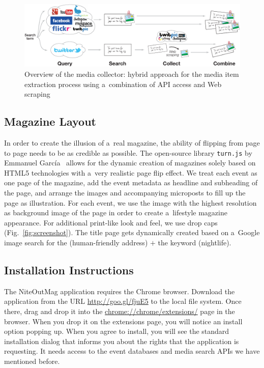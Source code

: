 \documentclass[runningheads,a4paper]{llncs}
\begin{document}
{\begin{figure}[htb!]
\centering
\includegraphics[width=0.8\linewidth]{./architecture.pdf}
\caption{Overview of the media collector: hybrid approach for the media item extraction process using a~combination of API access and Web scraping}
\label{fig:architecture}
\end{figure}

\subsection{Magazine Layout}
In order to create the illusion of a~real magazine, the ability of flipping from page to page needs to be as credible as possible. The open-source library \texttt{turn.js} by Emmanuel García~\cite{TurnJs2012} allows for the dynamic creation of magazines solely based on HTML5 technologies with a~very realistic page flip effect. We treat each event as one page of the magazine, add the event metadata as headline and subheading of the page, and arrange the images and accompanying microposts to fill up the page as illustration. For each event, we use the image with the highest resolution as background image of the page in order to create a~lifestyle magazine appearance. For additional print-like look and feel, we use drop caps (Fig.~\ref{fig:screenshot}). The title page gets dynamically created based on a~Google image search for the (human-friendly address) $+$ the keyword (nightlife).

\subsection{Installation Instructions}
The NiteOutMag application requires the Chrome browser. Download the application from the URL \url{http://goo.gl/fjuE5} to the local file system.
Once there, drag and drop it into the \url{chrome://chrome/extensions/} page in the browser. When you drop it on the extensions page, you will notice an install option popping up. When you agree to install, you will see the standard installation dialog that informs you about the rights that the application is requesting. It needs access to the event databases and media search APIs we have mentioned before.

}
\end{document}

